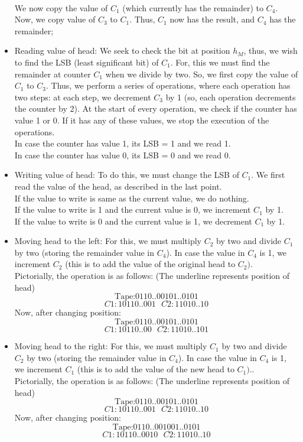 \documentclass[12pt,a4paper]{article}
\begin{document}
\begin{itemize}
    \\We now copy the value of $C_1$ (which currently has the remainder) to $C_4$.
    \\ Now, we copy value of $C_3$ to $C_1$. Thus, $C_1$ now has the result, and $C_4$ has the remainder;
    \item Reading value of head: We seek to check the bit at position $h_M$, thus, we wish to find the LSB (least significant bit) of $C_1$. For, this we must find the remainder at counter $C_1$ when we divide by two. So, we first copy the value of $C_1$ to $C_3$. Thus, we perform a series of operations, where each operation has two steps: at each step, we decrement $C_3$ by 1 (so, each operation decrements the counter by 2). At the start of every operation, we check if the counter has value 1 or 0. If it has any of these values, we stop the execution of the operations.
    \\In case the counter has value 1, its LSB = 1 and we read 1.
    \\In case the counter has value 0, its LSB = 0 and we read 0.
    \item Writing value of head: To do this, we must change the LSB of $C_1$. We first read the value of the head, as described in the last point.
    \\If the value to write is same as the current value, we do nothing.
    \\If the value to write is 1 and the current value is 0, we increment $C_1$ by 1.
    \\If the value to write is 0 and the current value is 1, we decrement $C_1$ by 1.
    \item Moving head to the left: For this, we must multiply $C_2$ by two and divide $C_1$ by two (storing the remainder value in $C_4$). In case the value in $C_4$ is 1, we increment $C_2$ (this is to add the value of the original head to $C_2)$.
    \\Pictorially, the operation is as follows: (The underline represents position of head)
    $$\text{Tape:} 0110..00\underline{1}01..0101$$
    $$C1: 10110..001 \textbf{     } C2: 11010..10 $$
    Now, after changing position:
    $$\text{Tape:} 0110..0\underline{0}101..0101$$
    $$C1: 10110..00 \textbf{     } C2: 11010..101 $$
    \item Moving head to the right: For this, we must multiply $C_1$ by two and divide $C_2$ by two (storing the remainder value in $C_4$). In case the value in $C_4$ is 1, we increment $C_1$ (this is to add the value of the new head to $C_1)$..
    \\Pictorially, the operation is as follows: (The underline represents position of head)
    $$\text{Tape:} 0110..00\underline{1}01..0101$$
    $$C1: 10110..001 \textbf{     } C2: 11010..10 $$
    Now, after changing position:
    $$\text{Tape:} 0110..001\underline{0}01..0101$$
    $$C1: 10110..0010 \textbf{     } C2: 11010..10 $$
\end{itemize}
\end{document}
